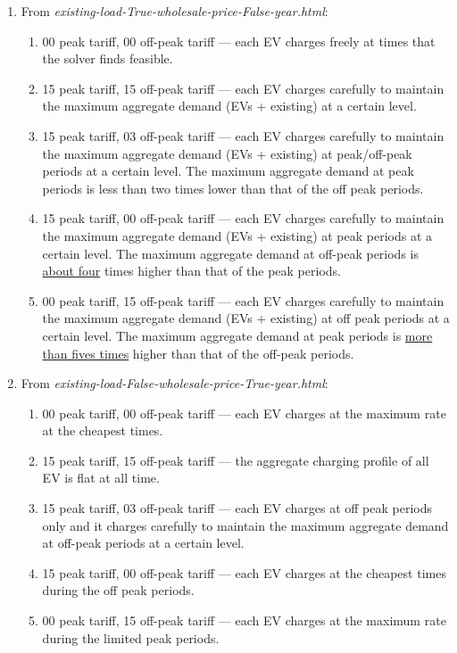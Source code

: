 \documentclass[a4paper]{llncs}
\begin{document}
\begin{enumerate}
	\item From \textit{existing-load-True-wholesale-price-False-year.html}:
	
	\begin{enumerate}
		\item 00 peak tariff, 00 off-peak tariff --- each EV charges freely at times that the solver finds feasible. 
		\item 15 peak tariff, 15 off-peak tariff --- each EV charges carefully to maintain the maximum aggregate demand (EVs + existing) at a certain level. 
		\item 15 peak tariff, 03 off-peak tariff --- each EV charges carefully to maintain the maximum aggregate demand (EVs + existing) at peak/off-peak periods at a certain level. The maximum aggregate demand at peak periods is less than two times lower than that of the off peak periods. 
		\item 15 peak tariff, 00 off-peak tariff --- each EV charges carefully to maintain the maximum aggregate demand (EVs + existing) at peak periods at a certain level. The maximum aggregate demand at off-peak periods is \underline{about four} times higher than that of the peak periods. 
		\item 00 peak tariff, 15 off-peak tariff --- each EV charges carefully to maintain the maximum aggregate demand (EVs + existing) at off peak periods at a certain level. The maximum aggregate demand at peak periods is \underline{more than fives times} higher than that of the off-peak periods. 
	\end{enumerate}
	
	\item From \textit{existing-load-False-wholesale-price-True-year.html}:
	
	\begin{enumerate}
		\item 00 peak tariff, 00 off-peak tariff --- each EV charges at the maximum rate at the cheapest times.
		\item 15 peak tariff, 15 off-peak tariff --- the aggregate charging profile of all EV is flat at all time.
		\item 15 peak tariff, 03 off-peak tariff --- each EV charges at off peak periods only and it charges carefully to maintain the maximum aggregate demand at off-peak periods at a certain level.
		\item 15 peak tariff, 00 off-peak tariff --- each EV charges at the cheapest times during the off peak periods. 
		\item 00 peak tariff, 15 off-peak tariff --- each EV charges at the maximum rate during the limited peak periods. 
	\end{enumerate}
	
\end{enumerate}
\end{document}
